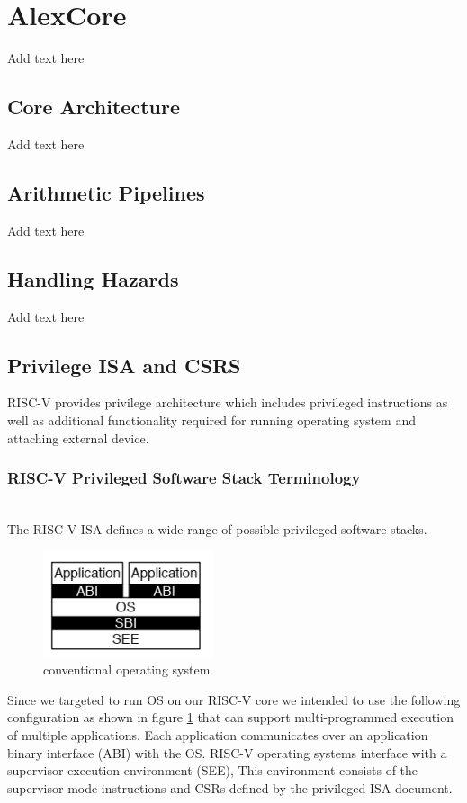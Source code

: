 \documentclass[../main.tex]{subfiles}
\begin{document}
\section{AlexCore}
Add text here

\subsection{Core Architecture}
Add text here

\subsection{Arithmetic Pipelines}
Add text here

\subsection{Handling Hazards}
Add text here

\subsection{Privilege ISA and CSRS}
RISC-V provides privilege architecture which includes privileged instructions as well as additional functionality required for running operating system and attaching external device.

\subsubsection*{RISC-V Privileged Software Stack Terminology}
\\The RISC-V ISA defines a wide range of possible privileged software stacks.
\begin{figure}[h]
\centering
\includegraphics[width=5cm]{diagrams/risc_v_stack.png}
\caption{conventional operating system}
\label{fig:software_stack}
\end{figure}
Since we targeted to run OS on our RISC-V core we intended to use the following configuration as shown in figure
\ref{fig:software_stack} that can support multi-programmed execution of multiple applications. Each application communicates over an application binary interface (ABI) with the OS. RISC-V
operating systems interface with a supervisor execution environment (SEE), This environment consists of the supervisor-mode instructions and CSRs defined by the privileged ISA document.
\end{document}
